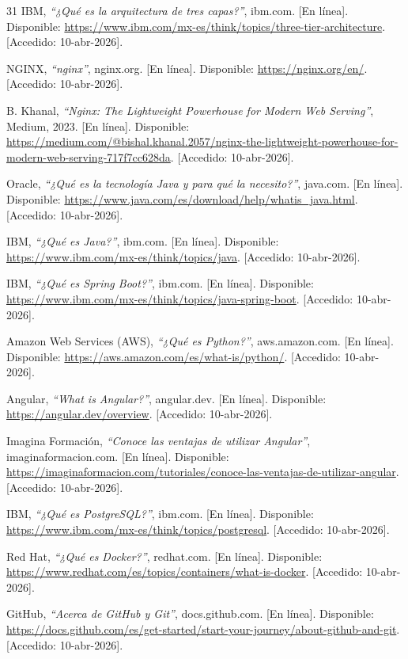 \begin{thebibliography}{31}
IBM, \textit{``¿Qué es la arquitectura de tres capas?''}, ibm.com. [En línea]. Disponible: \url{https://www.ibm.com/mx-es/think/topics/three-tier-architecture}. [Accedido: 10-abr-2026].

NGINX, \textit{``nginx''}, nginx.org. [En línea]. Disponible: \url{https://nginx.org/en/}. [Accedido: 10-abr-2026].

B. Khanal, \textit{``Nginx: The Lightweight Powerhouse for Modern Web Serving''}, Medium, 2023. [En línea]. Disponible: \url{https://medium.com/@bishal.khanal.2057/nginx-the-lightweight-powerhouse-for-modern-web-serving-717f7cc628da}. [Accedido: 10-abr-2026].

Oracle, \textit{``¿Qué es la tecnología Java y para qué la necesito?''}, java.com. [En línea]. Disponible: \url{https://www.java.com/es/download/help/whatis_java.html}. [Accedido: 10-abr-2026].

IBM, \textit{``¿Qué es Java?''}, ibm.com. [En línea]. Disponible: \url{https://www.ibm.com/mx-es/think/topics/java}. [Accedido: 10-abr-2026].

IBM, \textit{``¿Qué es Spring Boot?''}, ibm.com. [En línea]. Disponible: \url{https://www.ibm.com/mx-es/think/topics/java-spring-boot}. [Accedido: 10-abr-2026].

Amazon Web Services (AWS), \textit{``¿Qué es Python?''}, aws.amazon.com. [En línea]. Disponible: \url{https://aws.amazon.com/es/what-is/python/}. [Accedido: 10-abr-2026].

Angular, \textit{``What is Angular?''}, angular.dev. [En línea]. Disponible: \url{https://angular.dev/overview}. [Accedido: 10-abr-2026].

Imagina Formación, \textit{``Conoce las ventajas de utilizar Angular''}, imaginaformacion.com. [En línea]. Disponible: \url{https://imaginaformacion.com/tutoriales/conoce-las-ventajas-de-utilizar-angular}. [Accedido: 10-abr-2026].

IBM, \textit{``¿Qué es PostgreSQL?''}, ibm.com. [En línea]. Disponible: \url{https://www.ibm.com/mx-es/think/topics/postgresql}. [Accedido: 10-abr-2026].

Red Hat, \textit{``¿Qué es Docker?''}, redhat.com. [En línea]. Disponible: \url{https://www.redhat.com/es/topics/containers/what-is-docker}. [Accedido: 10-abr-2026].

GitHub, \textit{``Acerca de GitHub y Git''}, docs.github.com. [En línea]. Disponible: \url{https://docs.github.com/es/get-started/start-your-journey/about-github-and-git}. [Accedido: 10-abr-2026].


\end{thebibliography}
